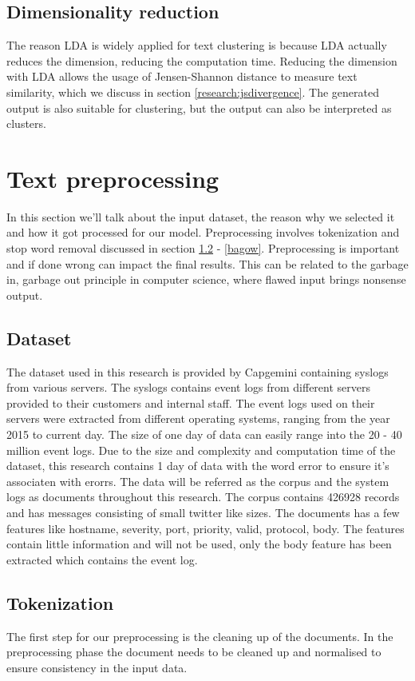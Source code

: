 \subsection{Dimensionality reduction}
The reason LDA is widely applied for text clustering is because LDA actually reduces the dimension, reducing the computation time. Reducing the dimension with LDA allows the usage of Jensen-Shannon distance to measure text similarity, which we discuss in section \ref{research:jsdivergence}. The generated output is also suitable for clustering, but the output can also be interpreted as clusters.

\section{Text preprocessing}
In this section we'll talk about the input dataset, the reason why we selected it and how it got processed for our model. Preprocessing involves tokenization and stop word removal discussed in section \ref{tokenization} - \ref{bagow}. Preprocessing is important and if done wrong can impact the final results. This can be related to the garbage in, garbage out principle in computer science, where flawed input brings nonsense output. 

\subsection{Dataset}
The dataset used in this research is provided by Capgemini containing syslogs from various servers. The syslogs contains event logs from different servers provided to their customers and internal staff. The event logs used on their servers were extracted from different operating systems, ranging from the year 2015 to current day. The size of one day of data can easily range into the 20 - 40 million event logs. Due to the size and complexity and computation time of the dataset, this research contains 1 day of data with the word error to ensure it's associaten with erorrs.
The data will be referred as the corpus and the system logs as documents throughout this research. The corpus contains 426928 records and has messages consisting of small twitter like sizes. The documents has a few features like hostname, severity, port, priority, valid, protocol, body. The features contain little information and will not be used, only the body feature has been extracted which contains the event log.

\subsection{Tokenization}\label{tokenization}
The first step for our preprocessing is the cleaning up of the documents. 
In the preprocessing phase the document needs to be cleaned up and normalised to ensure consistency in the input data.

